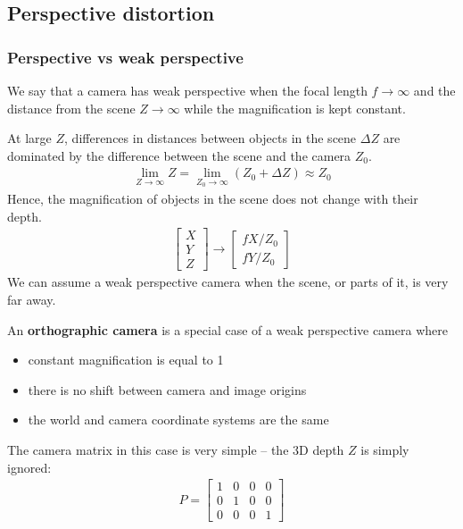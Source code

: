 \documentclass[11pt]{article}
\begin{document}
\subsection{Perspective distortion}
\subsubsection{Perspective vs weak perspective}
We say that a camera has weak perspective when the focal length $f \to \infty$ and the distance from the scene $Z \to \infty$ while the magnification is kept constant. 

At large $Z$, differences in distances between objects in the scene $\Delta Z$ are dominated by the difference between the scene and the camera $Z_0$. 
\begin{align*}
    \lim_{Z\to \infty} Z = \lim_{Z_0 \to\infty} (Z_0 + \Delta Z) \approx Z_0 
\end{align*}
Hence, the magnification of objects in the scene does not change with their depth. 
\begin{align*}
    \begin{bmatrix}
        X \\ Y \\ Z
    \end{bmatrix} \to 
    \begin{bmatrix}
        fX/Z_0 \\ fY/Z_0 
    \end{bmatrix}
\end{align*}
We can assume a weak perspective camera when the scene, or parts of it, is very far away. 

An \textbf{orthographic camera} is a special case of a weak perspective camera where 
\begin{itemize}
    \item constant magnification is equal to 1
    \item there is no shift between camera and image origins 
    \item the world and camera coordinate systems are the same 
\end{itemize} 
The camera matrix in this case is very simple -- the 3D depth $Z$ is simply ignored: 
\begin{align*}
    P = \begin{bmatrix}
        1 & 0 & 0 & 0 \\
        0 & 1 & 0 & 0 \\ 
        0 & 0 & 0 & 1
    \end{bmatrix}
\end{align*}
\end{document}
